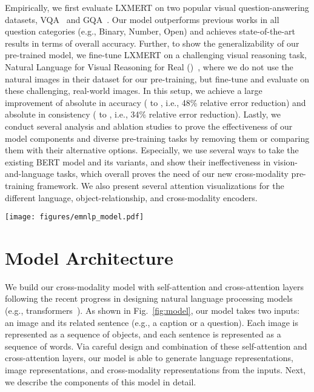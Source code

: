 \documentclass[11pt,a4paper]{article}
\begin{document}
Empirically, we first evaluate LXMERT on two popular visual question-answering datasets, VQA~\cite{antol2015vqa} and GQA~\cite{hudson2019gqa}. 
Our model outperforms previous works in all question categories (e.g., Binary, Number, Open) and achieves state-of-the-art results in terms of overall accuracy. 
Further, to show the generalizability of our pre-trained model, we fine-tune LXMERT on a challenging visual reasoning task, Natural Language for Visual Reasoning for Real ()~\cite{suhr2018corpus}, where we do not use the natural images in their dataset for our pre-training, but fine-tune and evaluate on these challenging, real-world images.
In this setup, we achieve a large improvement of  absolute in accuracy ( to , i.e., 48\% relative error reduction) and  absolute in consistency ( to , i.e., 34\% relative error reduction).
Lastly, we conduct several analysis and ablation studies to prove the effectiveness of our model components and diverse pre-training tasks by removing them or comparing them with their alternative options. Especially, we use several ways to take the existing BERT model and its variants, and show their ineffectiveness in vision-and-language tasks, which overall proves the need of our new cross-modality pre-training framework. We  also present several attention visualizations for the different language, object-relationship, and cross-modality encoders.
 \begin{figure*}[t]
\centering
\texttt{[image: figures/emnlp\_model.pdf]}
\caption{
The LXMERT model for learning vision-and-language cross-modality representations. `Self' and `Cross' are abbreviations for self-attention sub-layers and cross-attention sub-layers, respectively. `FF' denotes a feed-forward sub-layer. 
}
\vspace{-5pt}
\label{fig:model}
\end{figure*}

\section{Model Architecture}
\label{sec:model}
We build our cross-modality model with self-attention and cross-attention layers following the recent progress in designing natural language processing models (e.g., transformers~\cite{vaswani2017attention}).
As shown in Fig.~\ref{fig:model}, our model takes two inputs: an image and its related sentence (e.g., a caption or a question). 
Each image is represented as a sequence of objects, and each sentence is represented as a sequence of words.
Via careful design and combination of these self-attention and cross-attention layers, our model is able to generate language representations, image representations, and cross-modality representations from the inputs.
Next, we describe the components of this model in detail.
\end{document}
